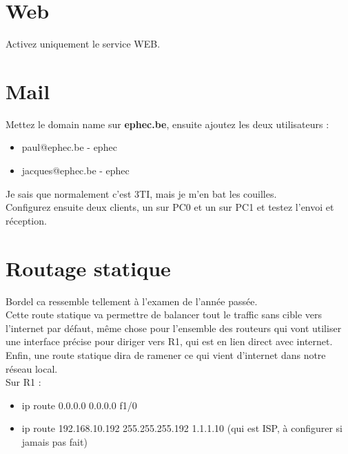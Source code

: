 \documentclass[a4paper,10pt,final,fleqn]{article}
\begin{document}
\section{Web}

	Activez uniquement le service WEB.\\


\section{Mail}

	Mettez le domain name sur \textbf{ephec.be}, ensuite ajoutez les deux utilisateurs : \\

	\begin{itemize}
		\item paul@ephec.be - ephec
		\item jacques@ephec.be - ephec\\
	\end{itemize}

	Je sais que normalement c'est 3TI, mais je m'en bat les couilles.\\

	Configurez ensuite deux clients, un sur PC0 et un sur PC1 et testez l'envoi et réception.\\

\section{Routage statique}

	Bordel ca ressemble tellement à l'examen de l'année passée.\\

	Cette route statique va permettre de balancer tout le traffic sans cible vers l'internet par défaut, même chose pour l'ensemble des routeurs qui vont utiliser une interface précise pour diriger vers R1, qui est en lien direct avec internet.\\

	Enfin, une route statique dira de ramener ce qui vient d'internet dans notre réseau local.\\

	Sur R1 : \\

	\begin{itemize}
		\item ip route 0.0.0.0 0.0.0.0 f1/0
		\item ip route 192.168.10.192 255.255.255.192 1.1.1.10 (qui est ISP, à configurer si jamais pas fait)\\
	\end{itemize}
\end{document}
